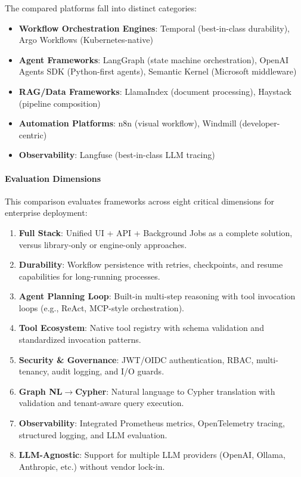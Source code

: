 \documentclass[a4paper,twoside]{sapthesis}
\begin{document}
The compared platforms fall into distinct categories:
\begin{itemize}
    \item \textbf{Workflow Orchestration Engines}: Temporal (best-in-class durability), Argo Workflows (Kubernetes-native)
    \item \textbf{Agent Frameworks}: LangGraph (state machine orchestration), OpenAI Agents SDK (Python-first agents), Semantic Kernel (Microsoft middleware)
    \item \textbf{RAG/Data Frameworks}: LlamaIndex (document processing), Haystack (pipeline composition)
    \item \textbf{Automation Platforms}: n8n (visual workflow), Windmill (developer-centric)
    \item \textbf{Observability}: Langfuse (best-in-class LLM tracing)
\end{itemize}

\paragraph{Evaluation Dimensions}

This comparison evaluates frameworks across eight critical dimensions for enterprise deployment:

\begin{enumerate}
    \item \textbf{Full Stack}: Unified UI + API + Background Jobs as a complete solution, versus library-only or engine-only approaches.
    \item \textbf{Durability}: Workflow persistence with retries, checkpoints, and resume capabilities for long-running processes.
    \item \textbf{Agent Planning Loop}: Built-in multi-step reasoning with tool invocation loops (e.g., ReAct, MCP-style orchestration).
    \item \textbf{Tool Ecosystem}: Native tool registry with schema validation and standardized invocation patterns.
    \item \textbf{Security \& Governance}: JWT/OIDC authentication, RBAC, multi-tenancy, audit logging, and I/O guards.
    \item \textbf{Graph NL$\rightarrow$Cypher}: Natural language to Cypher translation with validation and tenant-aware query execution.
    \item \textbf{Observability}: Integrated Prometheus metrics, OpenTelemetry tracing, structured logging, and LLM evaluation.
    \item \textbf{LLM-Agnostic}: Support for multiple LLM providers (OpenAI, Ollama, Anthropic, etc.) without vendor lock-in.
\end{enumerate}
\end{document}
